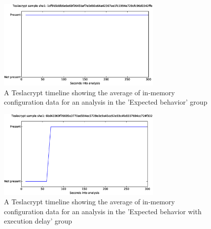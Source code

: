 \documentclass[conference]{IEEEtran}
\begin{document}
\begin{figure}[!h]
    \includegraphics[width=8cm,scale=0.5]{images/teslacrypt/teslacrypt-timelines-eps/Teslacrypt-1df9b5ddb6e6e6bf2645baf7e0d60a64a42367ae1fc1994e728cfc96d0342ffe.eps}
    \caption{A Teslacrypt timeline showing the average of in-memory configuration data for an analysis in the 'Expected behavior' group}
    \label{fig:teslacrypt-expected}
\end{figure}
\begin{figure}[!h]
    \includegraphics[width=8cm,scale=0.5]{images/teslacrypt/teslacrypt-timelines-eps/Teslacrypt-6bd43369f76695e3770ad594ec5728e0c9a45cc92e93c4fa8337694cc724f332.eps}
    \caption{A Teslacrypt timeline showing the average of in-memory configuration data for an analysis in the 'Expected behavior with execution delay' group}
    \label{fig:teslacrypt-expected-delay}
\end{figure}




%
%
%
\end{document}

